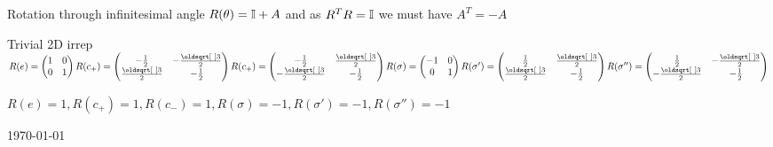 \begin{squishlist}
    \item Rotation through infinitesimal angle $R(\theta) = \mathbb{I} + A$ and as $R^T R = \mathbb{I}$ we must have $A^T = -A$
\end{squishlist}

\columnbreak
{}
\begin{squishlist}
    \item
    Trivial \squishsep  2D irrep \\
    $R(e) = \begin{pmatrix} 1 & 0 \\ 0 & 1 \end{pmatrix}
    R(c_+) = \begin{pmatrix} -\frac{1}{2} & -\frac{\sqrt{3}}{2} \\\frac{\sqrt{3}}{2} & -\frac{1}{2} \end{pmatrix}
    R(c_+) = \begin{pmatrix} -\frac{1}{2} & \frac{\sqrt{3}}{2} \\-\frac{\sqrt{3}}{2} & -\frac{1}{2} \end{pmatrix} \\
    R(\sigma) = \begin{pmatrix} -1 & 0 \\ 0 & 1 \end{pmatrix}
    R(\sigma') = \begin{pmatrix} \frac{1}{2} & \frac{\sqrt{3}}{2} \\ \frac{\sqrt{3}}{2} & -\frac{1}{2} \end{pmatrix}
    R(\sigma'') = \begin{pmatrix} \frac{1}{2} & -\frac{\sqrt{3}}{2} \\ -\frac{\sqrt{3}}{2} & -\frac{1}{2} \end{pmatrix}$

    \item $R(e)=1,R(c_+)=1,R(c_-)=1,R(\sigma)=-1,R(\sigma')=-1,R(\sigma'')=-1$
\end{squishlist}
    \vfill
\today

